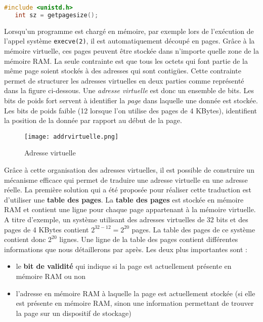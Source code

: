 \begin{lstlisting}[language=C]
#include <unistd.h>
   int sz = getpagesize();
\end{lstlisting} 

Lorsqu'un programme est chargé en mémoire, par exemple lors de
l'exécution de l'appel système \verb#execve(2)#, il est
automatiquement découpé en pages. Grâce à la mémoire virtuelle, ces
pages peuvent être stockée dans n'importe quelle zone de la mémoire
RAM. La seule contrainte est que tous les octets qui font partie de la
même page soient stockés à des adresses qui sont contigües. Cette
contrainte permet de structurer les adresses virtuelles en deux
parties comme représenté dans la figure ci-dessous. Une
\textit{adresse virtuelle} est donc un ensemble de bits. Les bits
de poids fort servent à identifier la \textit{page} dans laquelle une
donnée est stockée. Les bits de poids faible (12 lorsque l'on utilise
des pages de 4 KBytes), identifient la position de la donnée par
rapport au début de la page. \newline
  
\begin{figure}[!ht]
    \centering
    \texttt{[image: addrvirtuelle.png]}
    \caption{Adresse virtuelle}
\end{figure}
   
Grâce à cette organisation des adresses virtuelles, il est possible
de construire un mécanisme efficace qui permet de traduire une
adresse virtuelle en une adresse réelle. La première solution qui a
été proposée pour réaliser cette traduction est d'utiliser une
\textbf{table des pages}. La \textbf{table des pages} est stockée
en mémoire RAM et contient une ligne pour chaque page appartenant à
la mémoire virtuelle. A titre d'exemple, un système utilisant des
adresses virtuelles de 32 bits et des pages de 4 KBytes contient
$2^{32-12} =2^{20}$ pages. La table des pages de ce système
contient donc $2^{20}$ lignes. Une ligne de la table des
pages contient différentes informations que nous détaillerons par
après. Les deux plus importantes sont :
   
\begin{itemize}
    \item le \textbf{bit de validité} qui indique si la page est
        actuellement présente en mémoire RAM ou non
    \item l'adresse en mémoire RAM à laquelle la page est actuellement
        stockée (si elle est présente en mémoire RAM, sinon une
        information permettant de trouver la page sur un dispositif de
        stockage)
\end{itemize}
 
